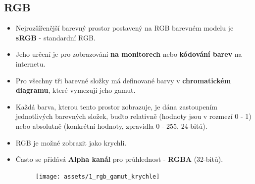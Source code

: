 \subsection{RGB}
\begin{itemize}
    \item Nejrozšířenější barevný prostor postavený na RGB barevném modelu je \textbf{sRGB} - standardní RGB.
    \item Jeho určení je pro zobrazování \textbf{na monitorech} nebo \textbf{kódování barev} na internetu.
    \item Pro všechny tři barevné složky má definované barvy v \textbf{chromatickém diagramu}, které vymezují jeho gamut.
    \item Každá barva, kterou tento prostor zobrazuje, je dána zastoupením jednotlivých barevných složek, buďto relativně (hodnoty jsou v rozmezí 0 - 1) nebo absolutně (konkrétní  hodnoty, zpravidla 0 - 255, 24-bitů).
    \item RGB je možné zobrazit jako krychli.
    \item Často se přidává \textbf{Alpha kanál} pro průhlednost - \textbf{RGBA} (32-bitů).
          \begin{figure}[H]
              \centering
              \texttt{[image: assets/1\_rgb\_gamut\_krychle]}
          \end{figure}
\end{itemize}

